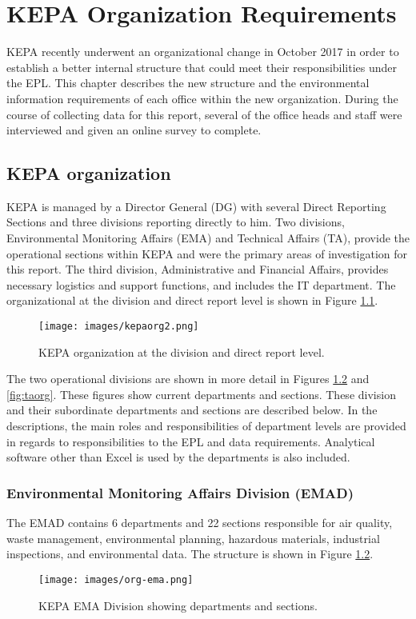 \chapter{KEPA Organization Requirements}

KEPA recently underwent an organizational change in October 2017 in order to establish a better internal structure that could meet their responsibilities under the EPL. This chapter describes the new structure and the environmental information requirements of each office within the new organization.  During the course of collecting data for this report, several of the office heads and staff were interviewed and given an online survey to complete. 

\section{KEPA organization}

KEPA is managed by a Director General (DG) with several Direct Reporting Sections and three divisions reporting directly to him. Two divisions, Environmental Monitoring Affairs (EMA) and Technical Affairs (TA), provide the operational sections within KEPA and were the primary areas of investigation for this report. The third division, Administrative and Financial Affairs, provides necessary logistics and support functions, and includes the IT department. The organizational at the division and direct report level is shown in Figure \ref{fig:kepaorg}. 

%
\begin{figure}[!htpb]
\centering
\texttt{[image: images/kepaorg2.png]} 
\caption{KEPA organization at the division and direct report level.}
\label{fig:kepaorg}
\end{figure}
%

The two operational divisions are shown in more detail in Figures \ref{fig:emaorg} and \ref{fig:taorg}. These figures show current departments and sections. These division and their subordinate departments and sections are described below. In the descriptions, the main roles and responsibilities of department levels are provided in regards to responsibilities to the EPL and data requirements.  Analytical software other than Excel is used by the departments is also included.

\subsection{Environmental Monitoring Affairs Division (EMAD)}
The EMAD contains 6 departments and 22 sections  responsible for air quality, waste management, environmental planning, hazardous materials, industrial inspections, and environmental data.  The structure is shown in  Figure \ref{fig:emaorg}.
%
\begin{figure}[!htpb]
\centering
\texttt{[image: images/org-ema.png]} 
\caption{KEPA EMA Division showing departments and sections.}
\label{fig:emaorg}
\end{figure}
%

